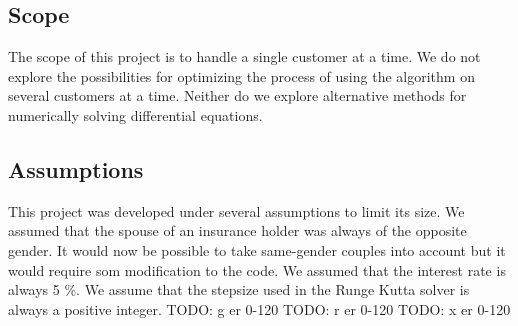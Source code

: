 \subsection{Scope}
	The scope of this project is to handle a single customer at a time. We do not explore the possibilities for optimizing the process of using the algorithm on several customers at a time. Neither do we explore alternative methods for numerically solving differential equations.
	
\subsection{Assumptions}
This project was developed under several assumptions to limit its size. We assumed that the spouse of an insurance holder was always of the opposite gender. It would now be possible to take same-gender couples into account but it would require som modification to the code. We assumed that the  interest rate is always 5 \%. We assume that the stepsize used in the Runge Kutta solver is always a positive integer. 
TODO: g er 0-120
TODO: r er 0-120
TODO: x er 0-120



